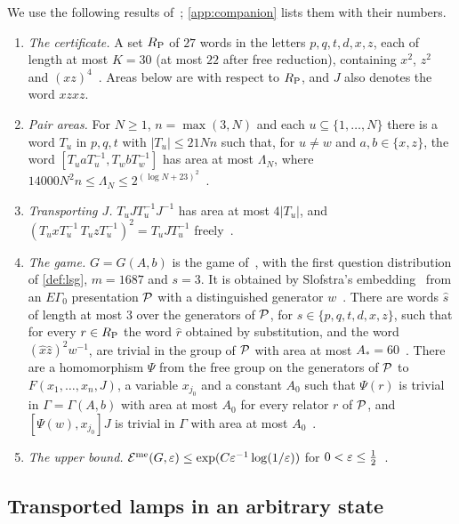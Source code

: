 We use the following results of~\cite{DM-game}; \cref{app:companion} lists them with their numbers.
\begin{enumerate}[label=(L\arabic*),leftmargin=3em,itemsep=2pt]
\item\label{L-RP} \emph{The certificate.} A set $R_{\mathrm P}$ of $27$ words in the letters $p,q,t,d,x,z$, each of length at
most $K=30$ (at most $22$ after free reduction), containing $x^2$, $z^2$ and $(xz)^4$~\cite[Definition~7.1 and
Table~2]{DM-game}. Areas below are with respect to $R_{\mathrm P}$, and $J$ also denotes the word $xzxz$.
\item\label{L-pair} \emph{Pair areas.} For $N\ge1$, $n=\max(3,N)$ and each $u\subseteq\{1,\dots,N\}$ there is a word $T_u$
in $p,q,t$ with $|T_u|\le21Nn$ such that, for $u\ne w$ and $a,b\in\{x,z\}$, the word
$[T_uaT_u^{-1},T_wbT_w^{-1}]$ has area at most $\Lambda_N$, where
$14000N^2n\le\Lambda_N\le2^{(\log N+23)^2}$~\cite[Theorem~7.8 and Remark~7.10]{DM-game}.
\item\label{L-J} \emph{Transporting $J$.} $T_uJT_u^{-1}J^{-1}$ has area at most $4|T_u|$, and
$(T_uxT_u^{-1}\,T_uzT_u^{-1})^2=T_uJT_u^{-1}$ freely~\cite[Lemma~7.11]{DM-game}.
\item\label{L-game} \emph{The game.} $G=G(A,b)$ is the game of~\cite[Theorem~10.5]{DM-game}, with the first question
distribution of \cref{def:lsg}, $m=1687$ and $s=3$. It is obtained by Slofstra's embedding~\cite[Lemma~B.1]{DM-game} from an
$E\Gamma_0$ presentation $\mathcal P$ with a distinguished generator $w$~\cite[Proposition~10.3]{DM-game}. There are words
$\hat s$ of length at most $3$ over the generators of $\mathcal P$, for $s\in\{p,q,t,d,x,z\}$, such that for every $r\in R_{\mathrm P}$ the word
$\hat r$ obtained by substitution, and the word $(\hat x\hat z)^2w^{-1}$, are trivial in the group of $\mathcal P$ with area at most
$A_*=60$~\cite[Proposition~10.3(d)]{DM-game}. There are a homomorphism $\Psi$ from the free group on the generators of $\mathcal P$
to $F(x_1,\dots,x_n,J)$, a variable $x_{j_0}$ and a constant $A_0$ such that $\Psi(r)$ is trivial in $\Gamma=\Gamma(A,b)$ with
area at most $A_0$ for every relator $r$ of $\mathcal P$, and $[\Psi(w),x_{j_0}]J$ is trivial in $\Gamma$ with area at most
$A_0$~\cite[Lemma~B.1, (G1) and (G2)]{DM-game}.
\item\label{L-upper} \emph{The upper bound.} $\mathcal E^{\mathrm{me}}(G,\varepsilon)\le\exp(C\varepsilon^{-1}\log(1/\varepsilon))$ for
$0<\varepsilon\le\frac12$~\cite[Theorem~10.5(d)]{DM-game}.
\end{enumerate}

\subsection{Transported lamps in an arbitrary state}

